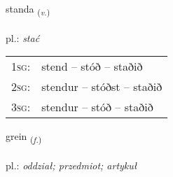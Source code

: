 \documentclass[frontgrid, backgrid]{flacards}\usepackage[]{graphicx}\usepackage[]{xcolor}
\begin{document}
{standa \small{\textsubscript{(\textit{v.})}} \\[1ex] %
\textphonetic{[stanta]} \\
pl.: \emph{stać} \\  [2ex]
\renewcommand*{\arraystretch}{0.8}
\begin{tabular}{p{1cm}l}
\textsc{1sg}: & stend -- stóð -- staðið \\ 
\textsc{2sg}: & stendur -- stóðst -- staðið \\ 
\textsc{3sg}: & stendur -- stóð -- staðið \\ 
\end{tabular}
}

\renewcommand{\flhead}{\vskip5pt \fboxsep=0pt {\small\bfseries\footnotesize Nafnorð | Noun}}
\renewcommand{\fcfoot}{\vskip5pt \fboxsep=0pt \hspace{2pt}{\small\bfseries\footnotesize 1K}}

\renewcommand{\blhead}{\vskip5pt {\small\bfseries\footnotesize Nafnorð | Noun }}
\renewcommand{\bcfoot}{\vskip5pt \hspace{2pt}{\small\bfseries\footnotesize 1K}}


{grein \small{\textsubscript{(\textit{f.})}} \\[1ex] %
\textphonetic{[kreiːn]} \\
pl.: \emph{oddział; przedmiot; artykuł} \\  [2ex]
\renewcommand*{\arraystretch}{0.8}
}

\renewcommand{\flhead}{\vskip5pt \fboxsep=0pt {\small\bfseries\footnotesize Greinir | Article}}
\renewcommand{\fcfoot}{\vskip5pt \fboxsep=0pt \hspace{2pt}{\small\bfseries\footnotesize 1K}}
\end{document}
